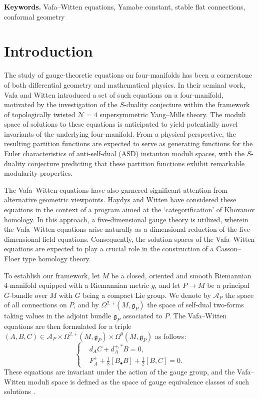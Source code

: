 \documentclass[12pt, twoside]{article}
\def\keywords#1{\par\medskip
	\noindent\textbf{Keywords.} #1}
\theoremstyle{definition}
\numberwithin{equation}{section}
\def\Om{\Omega}
\begin{document}
\keywords{Vafa--Witten equations, Yamabe constant, stable flat connections, conformal geometry}

\section{Introduction}
The study of gauge‑theoretic equations on four‑manifolds has been a cornerstone of both differential geometry and mathematical physics. 
In their seminal work, Vafa and Witten \cite{VW94} introduced a set of such equations on a four‑manifold, 
motivated by the investigation of the $S$-duality conjecture within the framework of topologically twisted $\mathcal{N}=4$ supersymmetric Yang--Mills theory. 
The moduli space of solutions to these equations is anticipated to yield potentially novel invariants of the underlying four-manifold.
 From a physical perspective, the resulting partition functions are expected to serve as generating functions for the Euler characteristics 
 of anti-self-dual (ASD) instanton moduli spaces, with the $S$-duality conjecture predicting that these partition functions 
 exhibit remarkable modularity properties.

The Vafa--Witten equations have also garnered significant attention from alternative geometric viewpoints. 
Haydys \cite{Hay15} and Witten \cite{Wit12} have considered these equations in the context of a program aimed at the `categorification' of Khovanov homology. 
In this approach, a five-dimensional gauge theory is utilized, wherein the Vafa--Witten equations arise naturally as a dimensional reduction of the five-dimensional field equations. Consequently, the solution spaces of the Vafa--Witten equations are expected to play a crucial role in the construction of a Casson--Floer type homology theory.

To establish our framework,  let $M$ be a closed, oriented and smooth Riemannian 4-manifold equipped with a Riemannian metric $g$, 
and let $P\rightarrow M$ be a principal $G$-bundle over $M$ with $G$ being a compact Lie group. 
We denote by $\mathcal{A}_{P}$ the space of all connections on $P$, and by $\Om^{2,+}(M,\mathfrak{g}_{P})$ the space of self-dual two-forms taking values in the adjoint bundle $\mathfrak{g}_{P}$ associated to $P$. 
The Vafa--Witten equations are then formulated for a triple  $(A,B,C)\in\mathcal{A}_{P}\times \Om^{2,+}(M,\mathfrak{g}_{P})\times\Om^{0}(M,\mathfrak{g}_{P})$ as follows:
\begin{equation}\label{E6}
\left\{
\begin{split}
&d_{A}C+d_{A}^{+,\ast}B=0,\\
&F_{A}^{+}+\frac{1}{8}[B_{\bullet}B]+\frac{1}{2}[B,C]=0.
\end{split}
\right.
\end{equation}
These equations are invariant under the action of the gauge group, and the Vafa--Witten moduli space is defined as the space of gauge equivalence classes of such solutions \cite{DG22,Gua23,Tan17}. 
\end{document}
